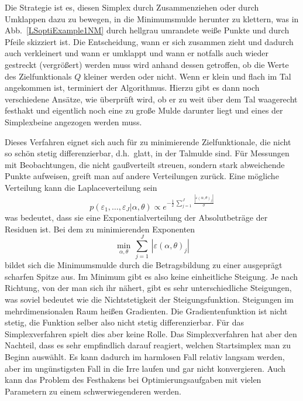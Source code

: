 Die Strategie ist es, diesen Simplex durch Zusammenziehen oder durch Umklappen dazu zu bewegen, in
die Minimumsmulde herunter zu klettern, was in Abb.~\ref{LSoptiExample1NM} durch hellgrau umrandete
weiße Punkte und durch Pfeile skizziert ist. Die Entscheidung, wann er sich zusammen zieht und dadurch
auch verkleinert und wann er umklappt und wann er notfalls auch wieder gestreckt (vergrößert) werden
muss wird anhand dessen getroffen, ob die Werte des Zielfunktionals $Q$ kleiner werden oder nicht.
Wenn er klein und flach im Tal angekommen ist, terminiert der Algorithmus. Hierzu gibt es dann noch
verschiedene Ansätze, wie überprüft wird, ob er zu weit über dem Tal waagerecht festhakt und eigentlich
noch eine zu große Mulde darunter liegt und eines der Simplexbeine angezogen werden muss.

Dieses Verfahren eignet sich auch für zu minimierende Zielfunktionale, die nicht so schön stetig
differenzierbar, d.h.\ glatt, in der Talmulde sind. Für Messungen mit Beobachtungen, die nicht gaußverteilt
streuen, sondern stark abweichende Punkte aufweisen, greift man auf andere Verteilungen zurück.
Eine mögliche Verteilung kann die Laplaceverteilung sein
\begin{equation}
p(\varepsilon_1,\dots,\varepsilon_J | \alpha, \theta)
\propto e^{-\frac{1}{2} \, \sum\limits_{j=1}^J \, \frac{| \varepsilon(\alpha,\theta)_j |}{\sigma} }
\end{equation}
was bedeutet, dass sie eine Exponentialverteilung der Absolutbeträge der
Residuen ist. Bei dem zu minimierenden Exponenten
\begin{equation}
\min_{\alpha,\theta} \, \sum\limits_{j=1}^J \, | \varepsilon(\alpha,\theta)_j |
\end{equation}
bildet sich die Minimumsmulde durch die Betragsbildung zu einer ausgeprägt scharfen Spitze aus.
Im Minimum gibt es also keine einheitliche Steigung. Je nach Richtung, von der man sich ihr nähert,
gibt es sehr unterschiedliche Steigungen, was soviel bedeutet wie die Nichtstetigkeit der
Steigungsfunktion. Steigungen im mehrdimensionalen Raum heißen Gradienten. Die Gradientenfunktion
ist nicht stetig, die Funktion selber also nicht stetig differenzierbar. Für das Simplexverfahren
spielt dies aber keine Rolle. Das Simplexverfahren hat aber den Nachteil, dass es sehr
empfindlich darauf reagiert, welchen Startsimplex man zu Beginn auswählt. Es kann dadurch
im harmlosen Fall relativ langsam werden, aber im ungünstigsten Fall in die Irre laufen und gar
nicht konvergieren. Auch kann das Problem des Festhakens bei Optimierungsaufgaben mit vielen
Parametern zu einem schwerwiegenderen werden.

